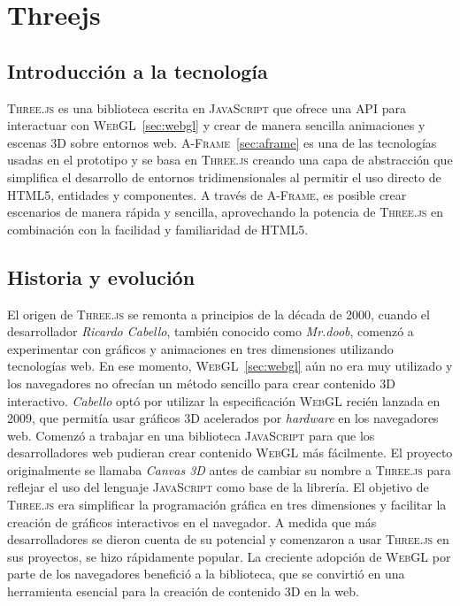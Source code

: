 \documentclass[a4paper, 11pt]{book}
\begin{document}
\section{Threejs}
\label{sec:threejs}
\subsection{Introducción a la tecnología}
\textsc{Three.js} es una biblioteca escrita en \textsc{JavaScript} que ofrece una \textsc{API} para interactuar con \textsc{WebGL}~\ref{sec:webgl} y crear de manera sencilla animaciones y escenas 3D sobre entornos web. 
\textsc{A-Frame}~\ref{sec:aframe} es una de las tecnologías usadas en el prototipo y se basa en \textsc{Three.js} creando una capa de abstracción que simplifica el desarrollo de entornos tridimensionales al permitir el uso directo de \textsc{HTML5}, entidades y componentes. A través de \textsc{A-Frame}, es posible crear escenarios de manera rápida y sencilla, aprovechando la potencia de \textsc{Three.js} en combinación con la facilidad y familiaridad de \textsc{HTML5}.
\subsection{Historia y evolución}
El origen de \textsc{Three.js} se remonta a principios de la década de 2000, cuando el desarrollador \emph{Ricardo Cabello}, también conocido como \emph{Mr.doob}, comenzó a experimentar con gráficos y animaciones en tres dimensiones utilizando tecnologías web. En ese momento, \textsc{WebGL}~\ref{sec:webgl} aún no era muy utilizado y los navegadores no ofrecían un método sencillo para crear contenido \textsc{3D} interactivo.
\emph{Cabello} optó por utilizar la especificación \textsc{WebGL} recién lanzada en 2009, que permitía usar gráficos \textsc{3D} acelerados por \emph{hardware} en los navegadores web. Comenzó a trabajar en una biblioteca \textsc{JavaScript} para que los desarrolladores web pudieran crear contenido \textsc{WebGL} más fácilmente.
El proyecto originalmente se llamaba \emph{Canvas 3D} antes de cambiar su nombre a \textsc{Three.js} para reflejar el uso del lenguaje \textsc{JavaScript} como base de la librería.
El objetivo de \textsc{Three.js} era simplificar la programación gráfica en tres dimensiones y facilitar la creación de gráficos interactivos en el navegador.
A medida que más desarrolladores se dieron cuenta de su potencial y comenzaron a usar \textsc{Three.js} en sus proyectos, se hizo rápidamente popular. La creciente adopción de \textsc{WebGL} por parte de los navegadores benefició a la biblioteca, que se convirtió en una herramienta esencial para la creación de contenido \textsc{3D} en la web.
\end{document}
